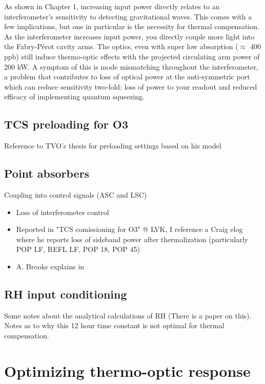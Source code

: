 


As shown in Chapter 1,  increasing input power directly relates to an interferometer's sensitivity to detecting gravitational waves. This comes with a few implications, but one in particular is the necessity for thermal compensation. As the interferometer increases input power, you directly couple more light into the Fabry-P\'{e}rot cavity arms. The optics, even with super low absorption ($\approx$ 400 ppb) still induce thermo-optic effects with the projected circulating arm power of 200 kW. A symptom of this is mode mismatching throughout the interferometer, a problem that contributes to loss of optical power at the anti-symmetric port which can reduce sensitivity two-fold: loss of power to your readout and reduced efficacy of implementing quantum squeezing.

\subsection{TCS preloading for O3}
Reference to TVO's thesis for preloading settings based on his model\cite{tvo}

\subsection{Point absorbers}
Coupling into control signals (ASC and LSC)
\begin{itemize}
\item Loss of interferometer control
\item Reported in "TCS comissioning for O3" @ LVK, I reference a Craig elog where he reports loss of sideband power after thermalization (particularly POP LF, REFL LF, POP 18, POP 45)
\item A. Brooks explains in \cite{brooks2021}
\end{itemize}


\subsection{RH input conditioning}
Some notes about the analytical calculations of RH (There is a paper on this).
Notes as to why this 12 hour time constant is not optimal for thermal compensation.
\section{Optimizing thermo-optic response}

